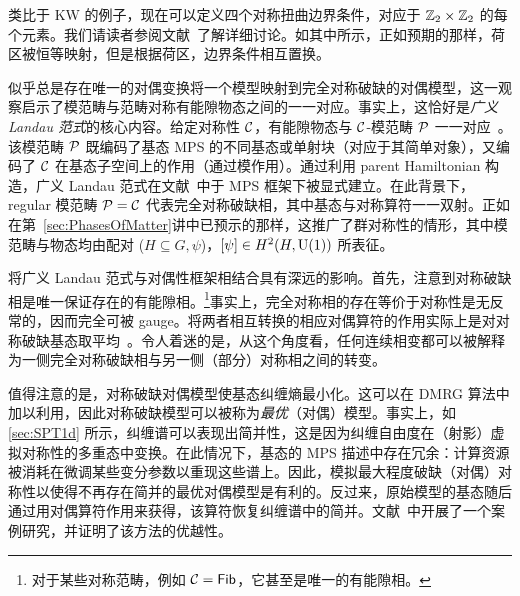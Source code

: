 类比于 KW 的例子，现在可以定义四个对称扭曲边界条件，对应于 $\mathbb Z_2\times\mathbb Z_2$ 的每个元素。我们请读者参阅文献~\cite{Li2023,Vancraeynest2025a}了解详细讨论。如其中所示，正如预期的那样，荷区被恒等映射，但是根据荷区，边界条件相互置换。

\bigskip\noindent 似乎总是存在唯一的对偶变换将一个模型映射到完全对称破缺的对偶模型，这一观察启示了模范畴与范畴对称有能隙物态之间的一一对应。事实上，这恰好是\emph{广义 Landau 范式}的核心内容。给定对称性 $\mathcal C$，有能隙物态与 $\mathcal C$-模范畴 $\mathcal P$ 一一对应~\cite{Thorngren2019,GarreRubio2022,Lootens2024}。该模范畴 $\mathcal P$ 既编码了基态 MPS 的不同基态或单射块（对应于其简单对象），又编码了 $\mathcal C$ 在基态子空间上的作用（通过模作用）。通过利用 parent Hamiltonian 构造，广义 Landau 范式在文献~\cite{GarreRubio2022}中于 MPS 框架下被显式建立。在此背景下，regular 模范畴 $\mathcal P=\mathcal C$ 代表完全对称破缺相，其中基态与对称算符一一双射。正如在第~\ref{sec:PhasesOfMatter}讲中已预示的那样，这推广了群对称性的情形，其中模范畴与物态均由配对 ($H\subseteq G,\psi$)，$[\psi]\in H^2(H,{\rm U}(1))$ 所表征。

将广义 Landau 范式与对偶性框架相结合具有深远的影响。首先，注意到对称破缺相是唯一保证存在的有能隙相。\footnote{对于某些对称范畴，例如 $\mathcal C=\mathsf{Fib}$，它甚至是唯一的有能隙相。}事实上，完全对称相的存在等价于对称性是无反常的，因而完全可被 gauge。将两者相互转换的相应对偶算符的作用实际上是对对称破缺基态取平均~\cite{Lootens2024,Vancraeynest2025b}。令人着迷的是，从这个角度看，任何连续相变都可以被解释为一侧完全对称破缺相与另一侧（部分）对称相之间的转变。

值得注意的是，对称破缺对偶模型使基态纠缠熵最小化。这可以在 DMRG 算法中加以利用，因此对称破缺模型可以被称为\emph{最优}（对偶）模型。事实上，如 \cref{sec:SPT1d} 所示，纠缠谱可以表现出简并性，这是因为纠缠自由度在（射影）虚拟对称性的多重态中变换。在此情况下，基态的 MPS 描述中存在冗余：计算资源被消耗在微调某些变分参数以重现这些谱上。因此，模拟最大程度破缺（对偶）对称性以使得不再存在简并的最优对偶模型是有利的。反过来，原始模型的基态随后通过用对偶算符作用来获得，该算符恢复纠缠谱中的简并。文献~\cite{Lootens2024}中开展了一个案例研究，并证明了该方法的优越性。

